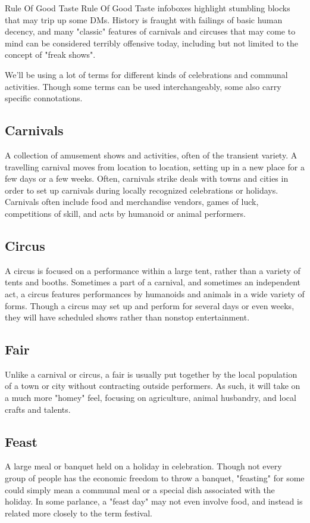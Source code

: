 \documentclass[10pt,a4paper,twoside,bg=print,twocolumn,openany,nodeprecatedcode]{dndbook}
\begin{document}
\begin{DndSidebar}[float=!b]{Rule Of Good Taste}
Rule Of Good Taste infoboxes highlight stumbling blocks that may trip up some DMs. History is fraught with failings of basic human decency, and many "classic" features of carnivals and circuses that may come to mind can be considered terribly offensive today, including but not limited to the concept of "freak shows".


\end{DndSidebar}

We'll be using a lot of terms for different kinds of celebrations and communal activities. Though some terms can be used interchangeably, some also carry specific connotations.
\subsection{Carnivals}
A collection of amusement shows and activities, often of the transient variety. A travelling carnival moves from location to location, setting up in a new place for a few days or a few weeks. Often, carnivals strike deals with towns and cities in order to set up carnivals during locally recognized celebrations or holidays. Carnivals often include food and merchandise vendors, games of luck, competitions of skill, and acts by humanoid or animal performers.
\subsection{Circus}
A circus is focused on a performance within a large tent, rather than a variety of tents and booths. Sometimes a part of a carnival, and sometimes an independent act, a circus features performances by humanoids and animals in a wide variety of forms. Though a circus may set up and perform for several days or even weeks, they will have scheduled shows rather than nonstop entertainment.
\subsection{Fair}
Unlike a carnival or circus, a fair is usually put together by the local population of a town or city without contracting outside performers. As such, it will take on a much more "homey" feel, focusing on agriculture, animal husbandry, and local crafts and talents.
\subsection{Feast}
A large meal or banquet held on a holiday in celebration. Though not every group of people has the economic freedom to throw a banquet, "feasting" for some could simply mean a communal meal or a special dish associated with the holiday. In some parlance, a "feast day" may not even involve food, and instead is related more closely to the term festival.
\end{document}
